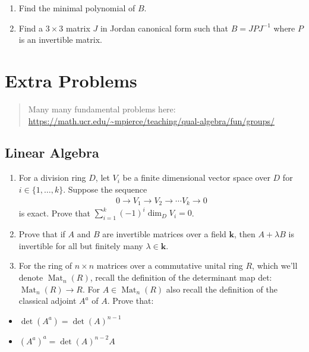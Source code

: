 \begin{enumerate}
\def\labelenumi{\alph{enumi}.}
\item
  Find the minimal polynomial of \(B\).
\item
  Find a \(3\times 3\) matrix \(J\) in Jordan canonical form such that
  \(B = JPJ^{-1}\) where \(P\) is an invertible matrix.
\end{enumerate}

\hypertarget{extra-problems}{%
\section{Extra Problems}\label{extra-problems}}

\begin{quote}
Many many fundamental problems here:
\url{https://math.ucr.edu/~mpierce/teaching/qual-algebra/fun/groups/}
\end{quote}

\hypertarget{linear-algebra}{%
\subsection{Linear Algebra}\label{linear-algebra}}

\begin{enumerate}
\def\labelenumi{\arabic{enumi}.}
\tightlist
\item
  For a division ring \(D\), let \(V_{i}\) be a finite dimensional
  vector space over \(D\) for \(i \in\{1, \ldots, k\}\). Suppose the
  sequence
  \begin{align*}
  0 \longrightarrow V_{1} \longrightarrow V_{2} \longrightarrow \cdots V_{k} \longrightarrow 0
  \end{align*}
  is exact. Prove that
  \(\sum_{i=1}^{k}(-1)^{i} \operatorname{dim}_{D} V_{i}=0\).
\item
  Prove that if \(A\) and \(B\) are invertible matrices over a field
  \(\boldsymbol{k}\), then \(A+\lambda B\) is invertible for all but
  finitely many \(\lambda \in \boldsymbol{k}\).
\item
  For the ring of \(n \times n\) matrices over a commutative unital ring
  \(R\), which we'll denote \(\operatorname{Mat}_{n}(R)\), recall the
  definition of the determinant map det:
  \(\operatorname{Mat}_{n}(R) \rightarrow R\). For
  \(A \in \operatorname{Mat}_{n}(R)\) also recall the definition of the
  classical adjoint \(A^{a}\) of \(A\). Prove that:
\end{enumerate}

\begin{itemize}
\tightlist
\item
  \(\operatorname{det}\left(A^{a}\right)=\operatorname{det}(A)^{n-1}\)
\item
  \(\left(A^{a}\right)^{a}=\operatorname{det}(A)^{n-2} A\)
\end{itemize}

